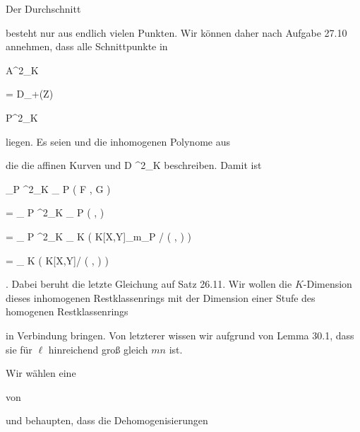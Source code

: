 {


Der Durchschnitt

 besteht nur aus endlich vielen Punkten. Wir können daher
nach Aufgabe 27.10
annehmen, dass alle Schnittpunkte in


\mavergleichskette

{\vergleichskette

{ {\mathbb A}^{2}_{K}
}

{ = }{ D_+(Z)
}

{ \subset }{ {\mathbb P}^{2}_{K}
}

{    }{
}

{   }{
}

}
{}{}{}
liegen. Es seien   {  und  }  {      }{ } die inhomogenen Polynome aus

 die die affinen Kurven   {  und  }  { D ^{2}_{K}   }{ } beschreiben. Damit ist


\mavergleichskettealignhandlinks

{\vergleichskettealignhandlinks

{ \sum_{P ^{2}_{K} }  _{ { P} }  (   F ,  G  )
}

{ =} { \sum_{  P ^{2}_{K}  }  _{ { P} }  (     ,    )
}

{ =} { \sum_{  P ^{2}_{K}  } \dim_{ K } \left(   K[X,Y]_{{\mathfrak m}_P }/ \left(   ,  \right)   \right)
}

{ =} { \dim_{ K } \left(   K[X,Y]/ \left(   ,  \right)   \right)
}

{ } {
}

}
{}
{}{.}
Dabei beruht die letzte Gleichung auf
Satz 26.11.
Wir wollen die $K$-Dimension dieses inhomogenen Restklassenrings mit der Dimension einer Stufe des homogenen Restklassenrings

 in Verbindung bringen. Von letzterer wissen wir aufgrund von
Lemma 30.1,
dass sie für $\ell$ hinreichend groß gleich $mn$ ist.


Wir wählen eine


 von

 {} {}
und behaupten, dass die Dehomogenisierungen


}
